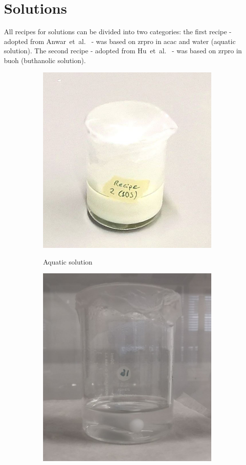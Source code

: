 \section{Solutions}\label{sec:exp-sol}
All recipes for solutions can be divided into two categories:
the first recipe - adopted from Anwar~et~al.~\cite{Anwar2017} - was based on \gls{zrpro} in \gls{acac} and \gls{water} (aquatic solution).
The second recipe - adopted from Hu~et~al.~\cite{Hu2016} - was based on \gls{zrpro} in \gls{buoh} (buthanolic solution).

\begin{figure}[htb]
	\centering
	\begin{subfigure}{0.49\textwidth}
		\centering
		\includegraphics[height=0.8\textwidth]{Pics/sol-aq.png}
		\label{fig:sol-aq}
		\caption{Aquatic solution}
	\end{subfigure}
	\begin{subfigure}{0.49\textwidth}
		\centering
		\includegraphics[height=0.8\textwidth]{Pics/sol-bu.png}

\end{subfigure}
\end{figure}
